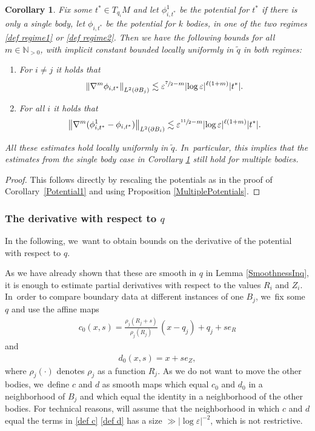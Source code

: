 \documentclass[10pt]{amsart}
\let\epsilon\varepsilon
\newtheorem{corollary}[theorem]{Corollary}
\theoremstyle{definition}
\newcommand\N{\mathbb{N}}
\newcommand\norm[1]{\left\lVert #1\right\rVert}
\newcommand\eq{=}
\let\de\partial
\let\eps\epsilon
\begin{document}
\begin{corollary}\label{MultPotSpec}
Fix some $t^*\in T_{q_i}M$ and let $\phi_{i,t^*}^1$ be the potential for $t^*$ if there is only a single body, let $\phi_{i,t^*}$ be the potential for $k$ bodies, in one of the two regimes \eqref{def regime1} or \eqref{def regime2}. Then we have the following bounds for all $m\in \N_{>0}$, with implicit constant bounded locally uniformly in $\tilde{q}$ in both regimes:
\begin{enumerate}
\item\label{MultPotSpeca}
For $i\neq j$ it holds that
\begin{align*}
\norm{\nabla^m\phi_{i,t^*}}_{L^2(\de B_j)}\lesssim \eps^{\sfrac{7}{2}-m}|{\log\eps}|^{\ell(1+m)}|t^*|.
\end{align*}

\item\label{MultPotSpecb}
For all $i$ it holds that
\begin{align*}
\norm{\nabla^m(\phi_{i,t^*}^1-\phi_{i,t^*})}_{L^2(\de B_{i})}\lesssim \eps^{\sfrac{11}{2}-m}|{\log\eps}|^{\ell(1+m)}|t^*|.
\end{align*}
\end{enumerate}
All these estimates hold locally uniformly in $\tilde{q}$. In~particular, this implies that the estimates from the single body case in Corollary \ref{MultPotSpec} still hold for multiple bodies.
\end{corollary}
\begin{proof}
This follows directly by rescaling the potentials as in the proof of Corollary~\ref{Potential1} and using Proposition \ref{MultiplePotentials}.
\end{proof}

\subsubsection{The derivative with respect to $q$}\label{sec q deri}

In the following, we~want to obtain bounds on the derivative of the potential with respect to $q$.

As we have already shown that these are smooth in $q$ in Lemma \ref{SmoothnessInq}, it is enough to estimate partial derivatives with respect to the values $R_i$ and $Z_i$. In~order to compare boundary data at different instances of one $B_j$, we~fix some $q$ and use the affine maps
\begin{align}\label{def c}
c_0(x,s)\eq\frac{\rho_j(R_j+s)}{\rho_j(R_j)}\,(x-q_j)+q_j+se_R
\end{align}
and
\begin{align}\label{def d}
d_0(x,s)\eq x+se_Z,
\end{align}
where $\rho_j(\cdot)$ denotes $\rho_j$ as a function $R_j$. As we do not want to move the other bodies, we~define $c$ and $d$ as smooth maps which equal $c_0$ and $d_0$ in a neighborhood of $B_j$ and which equal the identity in a neighborhood of the other bodies. For technical reasons, will assume that the neighborhood in which $c$ and $d$ equal the terms in \eqref{def c} \resp \eqref{def d} has a size $\gg|{\log\eps}|^{-2}$, which is not restrictive.
\end{document}
